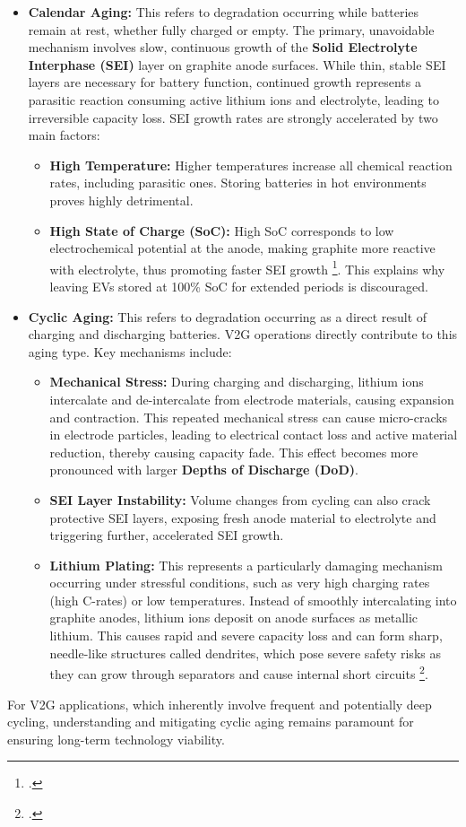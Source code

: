 \begin{itemize}
    \item \textbf{Calendar Aging:} This refers to degradation occurring while batteries remain at rest, whether fully charged or empty. The primary, unavoidable mechanism involves slow, continuous growth of the \textbf{Solid Electrolyte Interphase (SEI)} layer on graphite anode surfaces. While thin, stable SEI layers are necessary for battery function, continued growth represents a parasitic reaction consuming active lithium ions and electrolyte, leading to irreversible capacity loss. SEI growth rates are strongly accelerated by two main factors:
    \begin{itemize}
        \item \textbf{High Temperature:} Higher temperatures increase all chemical reaction rates, including parasitic ones. Storing batteries in hot environments proves highly detrimental.
        \item \textbf{High State of Charge (SoC):} High SoC corresponds to low electrochemical potential at the anode, making graphite more reactive with electrolyte, thus promoting faster SEI growth \footcite{vetter2005ageing}. This explains why leaving EVs stored at 100\% SoC for extended periods is discouraged.
    \end{itemize}

    \item \textbf{Cyclic Aging:} This refers to degradation occurring as a direct result of charging and discharging batteries. V2G operations directly contribute to this aging type. Key mechanisms include:
    \begin{itemize}
        \item \textbf{Mechanical Stress:} During charging and discharging, lithium ions intercalate and de-intercalate from electrode materials, causing expansion and contraction. This repeated mechanical stress can cause micro-cracks in electrode particles, leading to electrical contact loss and active material reduction, thereby causing capacity fade. This effect becomes more pronounced with larger \textbf{Depths of Discharge (DoD)}.
        \item \textbf{SEI Layer Instability:} Volume changes from cycling can also crack protective SEI layers, exposing fresh anode material to electrolyte and triggering further, accelerated SEI growth.
        \item \textbf{Lithium Plating:} This represents a particularly damaging mechanism occurring under stressful conditions, such as very high charging rates (high C-rates) or low temperatures. Instead of smoothly intercalating into graphite anodes, lithium ions deposit on anode surfaces as metallic lithium. This causes rapid and severe capacity loss and can form sharp, needle-like structures called dendrites, which pose severe safety risks as they can grow through separators and cause internal short circuits \footcite{birkl2017degradation}.
    \end{itemize}
\end{itemize}
\noindent
For V2G applications, which inherently involve frequent and potentially deep cycling, understanding and mitigating cyclic aging remains paramount for ensuring long-term technology viability.

